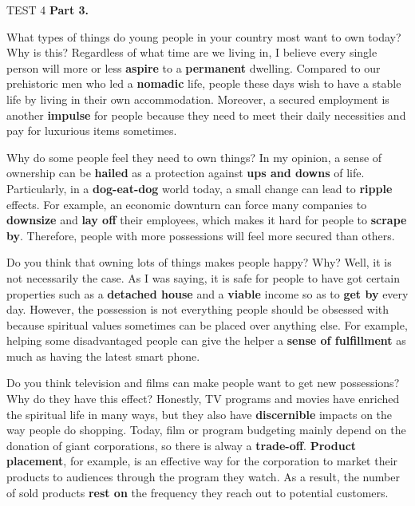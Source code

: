 \begin{glossarymc}[Cambridge 10]
\begin{test}{TEST 4}
    \noindent
    \textbf{Part 3.}
    \begin{qa}{What types of things do young people in your country most want to own today? Why is this?}
    Regardless of what time are we living in, I believe every single person will more or less \textbf{aspire} to a \textbf{permanent} dwelling. Compared to our prehistoric men who led a \textbf{nomadic} life, people these days wish to have a stable life by living in their own accommodation. Moreover, a secured employment is another \textbf{impulse} for people because they need to meet their daily necessities and pay for luxurious items sometimes.
    \end{qa}

    \begin{qa}{Why do some people feel they need to own things?}
    In my opinion, a sense of ownership can be \textbf{hailed} as a protection against \textbf{ups and downs} of life. Particularly, in a \textbf{dog-eat-dog} world today, a small change can lead to \textbf{ripple} effects. For example, an economic downturn can force many companies to \textbf{downsize} and \textbf{lay off} their employees, which makes it hard for people to \textbf{scrape by}. Therefore, people with more possessions will feel more secured than others.
    \end{qa}

    \begin{qa}{Do you think that owning lots of things makes people happy? Why?}
    Well, it is not necessarily the case. As I was saying, it is safe for people to have got certain properties such as a \textbf{detached house} and a \textbf{viable} income so as to \textbf{get by} every day. However, the possession is not everything people should be obsessed with because spiritual values sometimes can be placed over anything else. For example, helping some disadvantaged people can give the helper a \textbf{sense of fulfillment} as much as having the latest smart phone.
    \end{qa}

    \begin{qa}{Do you think television and films can make people want to get new possessions? Why do they have this effect?}
    Honestly, TV programs and movies have enriched the spiritual life in many ways, but they also have \textbf{discernible} impacts on the way people do shopping. Today, film or program budgeting mainly depend on the donation of giant corporations, so there is alway a \textbf{trade-off}. \textbf{Product placement}, for example, is an effective way for the corporation to market their products to audiences through the program they watch. As a result, the number of sold products \textbf{rest on} the frequency they reach out to potential customers.
    \end{qa}


\end{test}
\end{glossarymc}
